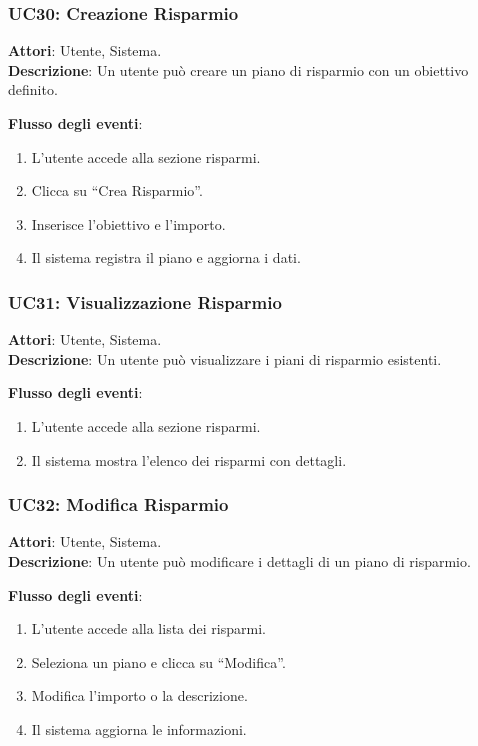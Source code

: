 \subsubsection{UC30: Creazione Risparmio}
\textbf{Attori}: Utente, Sistema. \\
\textbf{Descrizione}: Un utente può creare un piano di risparmio con un obiettivo definito.

\textbf{Flusso degli eventi}:
\begin{enumerate}
    \item L’utente accede alla sezione risparmi.
    \item Clicca su ``Crea Risparmio''.
    \item Inserisce l’obiettivo e l’importo.
    \item Il sistema registra il piano e aggiorna i dati.
\end{enumerate}

\subsubsection{UC31: Visualizzazione Risparmio}
\textbf{Attori}: Utente, Sistema. \\
\textbf{Descrizione}: Un utente può visualizzare i piani di risparmio esistenti.

\textbf{Flusso degli eventi}:
\begin{enumerate}
    \item L’utente accede alla sezione risparmi.
    \item Il sistema mostra l’elenco dei risparmi con dettagli.
\end{enumerate}

\subsubsection{UC32: Modifica Risparmio}
\textbf{Attori}: Utente, Sistema. \\
\textbf{Descrizione}: Un utente può modificare i dettagli di un piano di risparmio.

\textbf{Flusso degli eventi}:
\begin{enumerate}
    \item L’utente accede alla lista dei risparmi.
    \item Seleziona un piano e clicca su ``Modifica''.
    \item Modifica l’importo o la descrizione.
    \item Il sistema aggiorna le informazioni.
\end{enumerate}


